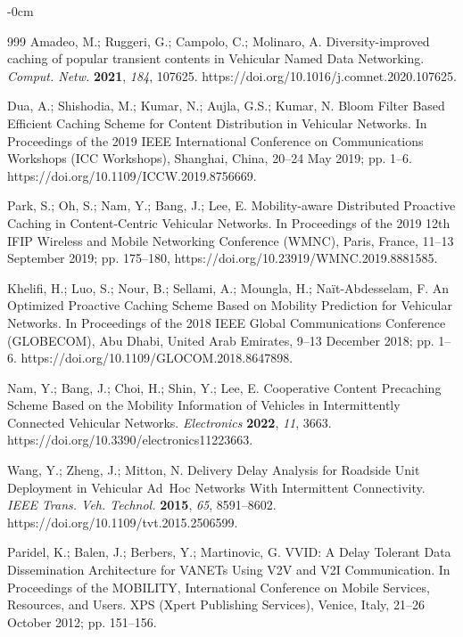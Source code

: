 \documentclass[sensors,aricle,accept,pdftex,moreauthors]{Definitions/mdpi}
\begin{document}
{\begin{adjustwidth}{-\extralength}{0cm}
\begin{thebibliography}{999}
 Amadeo, M.; Ruggeri, G.; Campolo, C.; Molinaro, A. Diversity-improved caching of popular transient contents in Vehicular Named Data Networking. {\em Comput. Netw.} {\bf 2021}, {\em 184}, 107625. https://doi.org/10.1016/j.comnet.2020.107625.

 Dua, A.; Shishodia, M.; Kumar, N.; Aujla, G.S.; Kumar, N. Bloom Filter Based Efficient Caching Scheme for Content Distribution in Vehicular Networks. In Proceedings of the 2019 IEEE International Conference on Communications Workshops (ICC Workshops), Shanghai, China, 20--24 May 2019; pp. 1--6. https://doi.org/10.1109/ICCW.2019.8756669.

 Park, S.; Oh, S.; Nam, Y.; Bang, J.; Lee, E. Mobility-aware Distributed Proactive Caching in Content-Centric Vehicular Networks. In Proceedings of the 2019 12th IFIP Wireless and Mobile Networking Conference (WMNC), Paris, France, 11--13 September 2019; pp. 175--180, https://doi.org/10.23919/WMNC.2019.8881585.

 Khelifi, H.; Luo, S.; Nour, B.; Sellami, A.; Moungla, H.; Naït-Abdesselam, F. An Optimized Proactive Caching Scheme Based on Mobility Prediction for Vehicular Networks. In Proceedings of the 2018 IEEE Global Communications Conference (GLOBECOM), Abu Dhabi, United Arab Emirates, 9--13 December 2018; pp. 1--6. https://doi.org/10.1109/GLOCOM.2018.8647898.

 Nam, Y.; Bang, J.; Choi, H.; Shin, Y.; Lee, E. Cooperative Content Precaching Scheme Based on the Mobility Information of Vehicles in Intermittently Connected Vehicular Networks. {\em Electronics} {\bf 2022}, {\em 11}, 3663. https://doi.org/10.3390/electronics11223663.


 Wang, Y.; Zheng, J.; Mitton, N. Delivery Delay Analysis for Roadside Unit Deployment in Vehicular Ad~Hoc Networks With Intermittent Connectivity. \emph{IEEE Trans. Veh. Technol. }\textbf{2015}, \emph{65}, 8591--8602. https://doi.org/10.1109/tvt.2015.2506599.

 Paridel, K.; Balen, J.; Berbers, Y.; Martinovic, G. VVID: A Delay Tolerant Data Dissemination Architecture for VANETs Using V2V and V2I Communication. In Proceedings of the MOBILITY, International Conference on Mobile Services, Resources, and Users. XPS (Xpert Publishing Services), Venice, Italy, 21--26 October 2012; pp. 151--156. 


\end{thebibliography}
\end{adjustwidth}}
\end{document}
